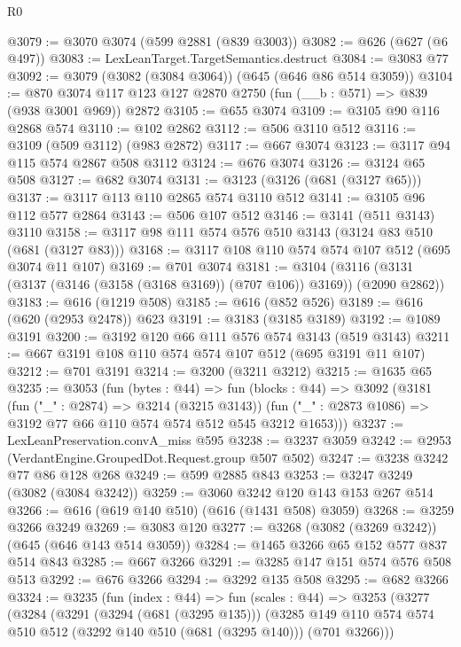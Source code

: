 \begin{lexlean}{R0}
\begin{coremodule}
@3079 := @3070 @3074 (@599 @2881 (@839 @3003))
@3082 := @626 (@627 (@6 @497))
@3083 := LexLeanTarget.TargetSemantics.destruct
@3084 := @3083 @77
@3092 := @3079 (@3082 (@3084 @3064)) (@645 (@646 @86 @514 @3059))
@3104 := @870 @3074 @117 @123 @127 @2870 @2750 (fun (__b : @571) => @839 (@938 @3001 @969)) @2872
@3105 := @655 @3074
@3109 := @3105 @90 @116 @2868 @574
@3110 := @102 @2862
@3112 := @506 @3110 @512
@3116 := @3109 (@509 @3112) (@983 @2872)
@3117 := @667 @3074
@3123 := @3117 @94 @115 @574 @2867 @508 @3112
@3124 := @676 @3074
@3126 := @3124 @65 @508
@3127 := @682 @3074
@3131 := @3123 (@3126 (@681 (@3127 @65)))
@3137 := @3117 @113 @110 @2865 @574 @3110 @512
@3141 := @3105 @96 @112 @577 @2864
@3143 := @506 @107 @512
@3146 := @3141 (@511 @3143) @3110
@3158 := @3117 @98 @111 @574 @576 @510 @3143 (@3124 @83 @510 (@681 (@3127 @83)))
@3168 := @3117 @108 @110 @574 @574 @107 @512 (@695 @3074 @11 @107)
@3169 := @701 @3074
@3181 := @3104 (@3116 (@3131 (@3137 (@3146 (@3158 (@3168 @3169)) (@707 @106)) @3169)) (@2090 @2862))
@3183 := @616 (@1219 @508)
@3185 := @616 (@852 @526)
@3189 := @616 (@620 (@2953 @2478)) @623
@3191 := @3183 (@3185 @3189)
@3192 := @1089 @3191
@3200 := @3192 @120 @66 @111 @576 @574 @3143 (@519 @3143)
@3211 := @667 @3191 @108 @110 @574 @574 @107 @512 (@695 @3191 @11 @107)
@3212 := @701 @3191
@3214 := @3200 (@3211 @3212)
@3215 := @1635 @65
@3235 := @3053
    (fun (bytes : @44) =>
    fun (blocks : @44) =>
    @3092
      (@3181
        (fun ("_" : @2874) => @3214 (@3215 @3143))
        (fun ("_" : @2873 @1086) => @3192 @77 @66 @110 @574 @574 @512 @545 @3212 @1653)))
@3237 := LexLeanPreservation.convA_miss @595
@3238 := @3237 @3059
@3242 := @2953 (VerdantEngine.GroupedDot.Request.group @507 @502)
@3247 := @3238 @3242 @77 @86 @128 @268
@3249 := @599 @2885 @843
@3253 := @3247 @3249 (@3082 (@3084 @3242))
@3259 := @3060 @3242 @120 @143 @153 @267 @514
@3266 := @616 (@619 @140 @510) (@616 (@1431 @508) @3059)
@3268 := @3259 @3266 @3249
@3269 := @3083 @120
@3277 := @3268 (@3082 (@3269 @3242)) (@645 (@646 @143 @514 @3059))
@3284 := @1465 @3266 @65 @152 @577 @837 @514 @843
@3285 := @667 @3266
@3291 := @3285 @147 @151 @574 @576 @508 @513
@3292 := @676 @3266
@3294 := @3292 @135 @508
@3295 := @682 @3266
@3324 := @3235
    (fun (index : @44) =>
    fun (scales : @44) =>
    @3253
      (@3277
        (@3284
          (@3291
            (@3294 (@681 (@3295 @135)))
            (@3285
              @149
              @110
              @574
              @574
              @510
              @512
              (@3292 @140 @510 (@681 (@3295 @140)))
              (@701 @3266)))

\end{coremodule}
\end{lexlean}
